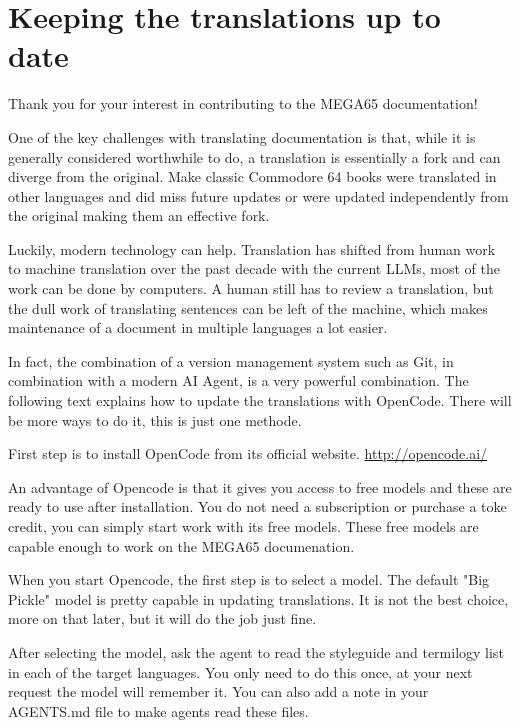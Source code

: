 



\chapter{Keeping the translations up to date}

Thank you for your interest in contributing to the MEGA65 documentation!

One of the key challenges with translating documentation is that, while it is generally considered worthwhile to do, a translation is essentially a fork
and can diverge from the original. Make classic Commodore 64 books were translated in other languages and did miss future updates or were updated
independently from the original making them an effective fork.

Luckily, modern technology can help. Translation has shifted from human work to machine translation over the past decade with the current LLMs, most of the
work can be done by computers. A human still has to review a translation, but the dull work of translating sentences can be left of the machine, which
makes maintenance of a document in multiple languages a lot easier.

In fact, the combination of a version management system such as Git, in combination with a modern AI Agent, is a very powerful combination. The following text
explains how to update the translations with OpenCode. There will be more ways to do it, this is just one methode.

First step is to install OpenCode from its official website. \url{http://opencode.ai/}

An advantage of Opencode is that it gives you access to free models and these are ready to use after installation. You do not need a subscription or purchase a
toke credit, you can simply start work with its free models. These free models are capable enough to work on the MEGA65 documenation.

When you start Opencode, the first step is to select a model. The default "Big Pickle" model is pretty capable in updating translations. It is not the best
choice, more on that later, but it will do the job just fine.

After selecting the model, ask the agent to read the styleguide and termilogy list in each of the target languages. You only need to do this once, at your next request
the model will remember it. You can also add a note in your AGENTS.md file to make agents read these files.

